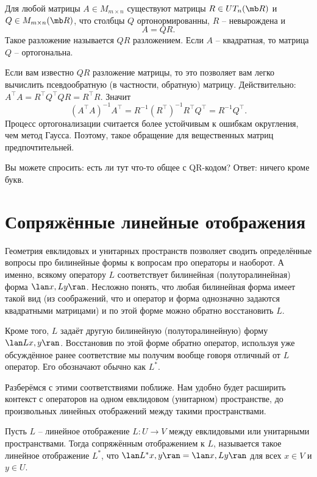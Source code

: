 \thrm Для любой матрицы  $A\in M_{m \times n}$ существуют матрицы $R\in UT_n(\mb R)$ и $Q\in M_{m\times n}(\mb R)$,  что столбцы $Q$ ортонормированны, $R$ -- невырождена и  
$$A=QR.$$
Такое разложение называется $QR$  разложением. Если $A$ -- квадратная, то матрица $Q$ -- ортогональна. 
\ethrm


Если вам известно $QR$ разложение матрицы, то это позволяет вам легко вычислить псевдообратную (в частности, обратную) матрицу. Действительно: $A^\top A= R^{\top} Q^\top Q R= R^\top R$. Значит
$$(A^\top A)^{-1}A^\top= R^{-1} (R^\top)^{-1}R^\top Q^\top= R^{-1}Q^\top.$$
Процесс ортогонализации считается более устойчивым к ошибкам округления, чем метод Гаусса. Поэтому, такое обращение для вещественных матриц предпочтительней.


Вы можете спросить: есть ли тут что-то общее с QR-кодом? Ответ: ничего кроме букв.
 





\section{Сопряжённые линейные отображения}

Геометрия евклидовых и унитарных пространств позволяет сводить определённые вопросы про билинейные формы к вопросам про операторы и наоборот. А именно, всякому оператору $L$ соответствует билинейная (полуторалинейная) форма $\lan x,Ly\ran$. Несложно понять, что любая билинейная форма имеет такой вид (из соображений, что и оператор и форма однозначно  задаются квадратными матрицами) и по этой форме можно обратно восстановить $L$.

Кроме того, $L$ задаёт другую билинейную (полуторалинейную) форму $\lan Lx,y\ran$. Восстановив по этой форме обратно оператор, используя уже обсуждённое ранее соответствие мы получим вообще говоря отличный от $L$ оператор. Его обозначают обычно как $L^*$. 

Разберёмся с этими соответствиями поближе. Нам удобно будет расширить контекст с операторов на одном евклидовом (унитарном) пространстве, до произвольных линейных отображений между такими пространствами.

\dfn Пусть $L$ -- линейное отображение $L\colon U \to V$ между евклидовыми или унитарными пространствами. Тогда сопряжённым отображением к $L$, называется такое линейное отображение $L^*$, что $\lan L^*x,y\ran = \lan x,Ly\ran$ для всех $x\in V$ и $y \in U$.
\edfn

